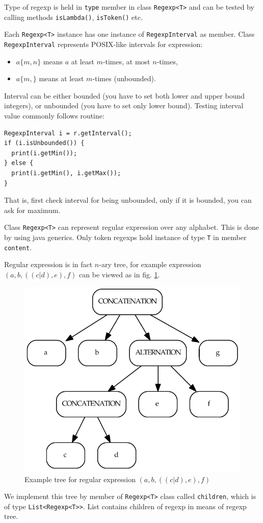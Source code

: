 \documentclass[a4paper,10pt,oneside]{article}
\newcommand{\myscale}{0.74}
\newcommand{\code}[1]{\texttt{#1}}
\begin{document}
Type of regexp is held in \code{type} member in class \code{Regexp<T>} and can be tested by calling methods \code{isLambda()}, \code{isToken()} etc.

Each \code{Regexp<T>} instance has one instance of \code{RegexpInterval} as member.
Class \code{RegexpInterval} represents POSIX-like intervals for expression:
\begin{itemize}
	\item $a\{m,n\}$ means $a$ at least $m$-times, at most $n$-times,
	\item $a\{m,\}$ means at least $m$-times (unbounded).
\end{itemize}
Interval can be either bounded (you have to set both lower and upper bound integers), or unbounded (you have to set only lower bound).
Testing interval value commonly follows routine:
\begin{verbatim}
RegexpInterval i = r.getInterval();
if (i.isUnbounded()) {
  print(i.getMin());
} else {
  print(i.getMin(), i.getMax());
}
\end{verbatim}
That is, first check interval for being unbounded, only if it is bounded, you can ask for maximum.

Class \code{Regexp<T>} can represent regular expression over any alphabet.
This is done by using java generics.
Only token regexps hold instance of type \code{T} in member \code{content}.

Regular expression is in fact $n$-ary tree, for example expression $(a, b, ((c | d), e), f)$ can be viewed as in fig. \ref{reg_tree}.
\begin{figure}
\centering\includegraphics[scale=\myscale]{reg_tree}
\caption{Example tree for regular expression $(a, b, ((c | d), e), f)$} \label{reg_tree}
\end{figure}
We implement this tree by member of \code{Regexp<T>} class called \code{children}, which is of type \code{List<Regexp<T>{}>}.
List contains children of regexp in means of regexp tree.
\end{document}
